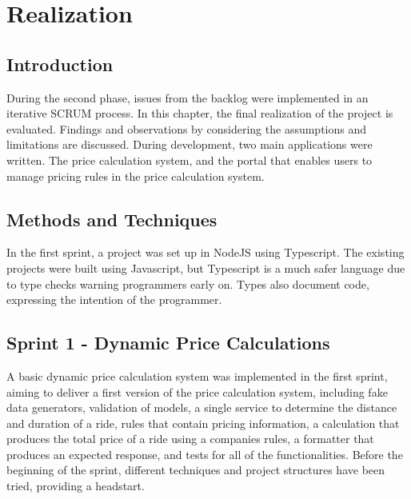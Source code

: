 \graphicspath{{Chapter6/Figs/Vector/}{Chapter6/Figs/}}

%
\chapter{Realization}
\section{Introduction}
During the second phase, issues from the backlog were implemented in an iterative SCRUM process. In this chapter, the final realization of the project is evaluated. Findings and observations by considering the assumptions and limitations are discussed. During development, two main applications were written. The price calculation system, and the portal that enables users to manage pricing rules in the price calculation system.

%
\section{Methods and Techniques}
In the first sprint, a project was set up in NodeJS using Typescript. The existing projects were built using Javascript, but Typescript is a much safer language due to type checks warning programmers early on. Types also document code, expressing the intention of the programmer.

%
\section{Sprint 1 - Dynamic Price Calculations}
A basic dynamic price calculation system was implemented in the first sprint, aiming to deliver a first version of the price calculation system, including fake data generators, validation of models, a single service to determine the distance and duration of a ride, rules that contain pricing information, a calculation that produces the total price of a ride using a companies rules, a formatter that produces an expected response, and tests for all of the functionalities. Before the beginning of the sprint, different techniques and project structures have been tried, providing a headstart.

